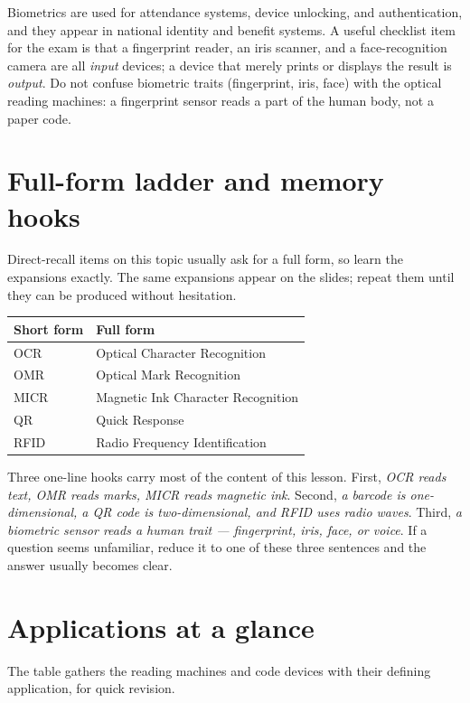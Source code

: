 Biometrics are used for attendance systems, device unlocking, and
authentication, and they appear in national identity and benefit systems. A
useful checklist item for the exam is that a fingerprint reader, an iris
scanner, and a face-recognition camera are all \emph{input} devices; a device
that merely prints or displays the result is \emph{output}. Do not confuse
biometric traits (fingerprint, iris, face) with the optical reading machines:
a fingerprint sensor reads a part of the human body, not a paper code.

\section{Full-form ladder and memory hooks}
Direct-recall items on this topic usually ask for a full form, so learn the
expansions exactly. The same expansions appear on the slides; repeat them
until they can be produced without hesitation.

\begin{center}
\begin{tabular}{p{}p{}}
\toprule
\textbf{Short form} & \textbf{Full form} \\
\midrule
OCR & Optical Character Recognition \\
OMR & Optical Mark Recognition \\
MICR & Magnetic Ink Character Recognition \\
QR & Quick Response \\
RFID & Radio Frequency Identification \\
\bottomrule
\end{tabular}
\end{center}

Three one-line hooks carry most of the content of this lesson. First,
\emph{OCR reads text, OMR reads marks, MICR reads magnetic ink}. Second,
\emph{a barcode is one-dimensional, a QR code is two-dimensional, and RFID
uses radio waves}. Third, \emph{a biometric sensor reads a human trait ---
fingerprint, iris, face, or voice}. If a question seems unfamiliar, reduce
it to one of these three sentences and the answer usually becomes clear.

\section{Applications at a glance}
The table gathers the reading machines and code devices with their defining
application, for quick revision.

